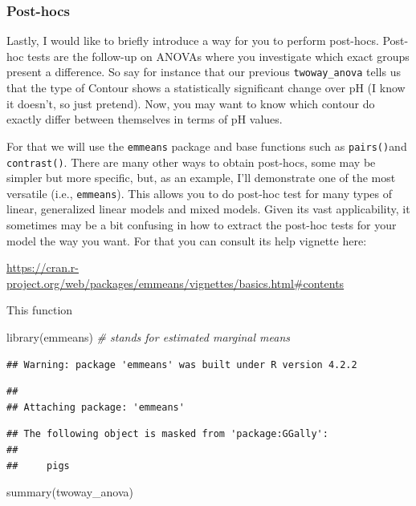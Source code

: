 \documentclass[
]{book}
\newenvironment{Shaded}{\begin{snugshade}}{\end{snugshade}}
\newcommand{\CommentTok}[1]{\textcolor[rgb]{0.56,0.35,0.01}{\textit{#1}}}
\newcommand{\FunctionTok}[1]{\textcolor[rgb]{0.00,0.00,0.00}{#1}}
\newcommand{\NormalTok}[1]{#1}
\begin{document}
\hypertarget{post-hocs}{%
\subsubsection{Post-hocs}\label{post-hocs}}

Lastly, I would like to briefly introduce a way for you to perform post-hocs. Post-hoc tests are the follow-up on ANOVAs where you investigate which exact groups present a difference. So say for instance that our previous \texttt{twoway\_anova} tells us that the type of Contour shows a statistically significant change over pH (I know it doesn't, so just pretend). Now, you may want to know which contour do exactly differ between themselves in terms of pH values.

For that we will use the \texttt{emmeans} package and base functions such as \texttt{pairs()}and \texttt{contrast()}. There are many other ways to obtain post-hocs, some may be simpler but more specific, but, as an example, I'll demonstrate one of the most versatile (i.e., \texttt{emmeans}). This allows you to do post-hoc test for many types of linear, generalized linear models and mixed models. Given its vast applicability, it sometimes may be a bit confusing in how to extract the post-hoc tests for your model the way you want. For that you can consult its help vignette here:

\url{https://cran.r-project.org/web/packages/emmeans/vignettes/basics.html\#contents}

This function

\begin{Shaded}
\begin{Highlighting}[]
\FunctionTok{library}\NormalTok{(emmeans)  }\CommentTok{\# stands for estimated marginal means}
\end{Highlighting}
\end{Shaded}

\begin{verbatim}
## Warning: package 'emmeans' was built under R version 4.2.2
\end{verbatim}

\begin{verbatim}
## 
## Attaching package: 'emmeans'
\end{verbatim}

\begin{verbatim}
## The following object is masked from 'package:GGally':
## 
##     pigs
\end{verbatim}

\begin{Shaded}
\begin{Highlighting}[]
\FunctionTok{summary}\NormalTok{(twoway\_anova)}
\end{Highlighting}
\end{Shaded}
\end{document}

